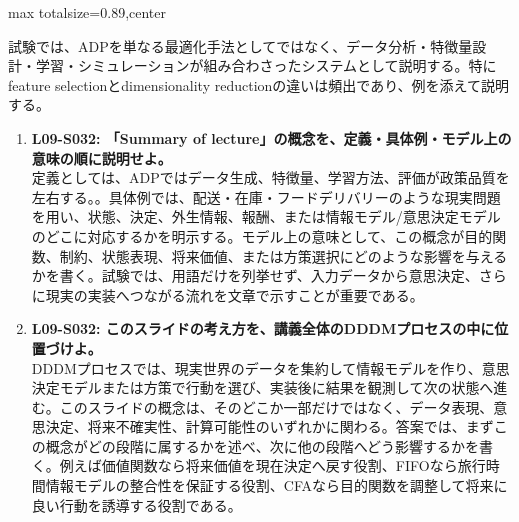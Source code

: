 \begin{minipage}[t]{0.58\textwidth}
\begin{adjustbox}{max totalsize={\textwidth}{0.89\textheight},center}
\begin{minipage}{\textwidth}
試験では、ADPを単なる最適化手法としてではなく、データ分析・特徴量設計・学習・シミュレーションが組み合わさったシステムとして説明する。特にfeature selectionとdimensionality reductionの違いは頻出であり、例を添えて説明する。\par{}\begin{enumerate}\item \textbf{L09-S032: 「Summary of lecture」の概念を、定義・具体例・モデル上の意味の順に説明せよ。}\\定義としては、ADPではデータ生成、特徴量、学習方法、評価が政策品質を左右する。。具体例では、配送・在庫・フードデリバリーのような現実問題を用い、状態、決定、外生情報、報酬、または情報モデル/意思決定モデルのどこに対応するかを明示する。モデル上の意味として、この概念が目的関数、制約、状態表現、将来価値、または方策選択にどのような影響を与えるかを書く。試験では、用語だけを列挙せず、入力データから意思決定、さらに現実の実装へつながる流れを文章で示すことが重要である。\item \textbf{L09-S032: このスライドの考え方を、講義全体のDDDMプロセスの中に位置づけよ。}\\DDDMプロセスでは、現実世界のデータを集約して情報モデルを作り、意思決定モデルまたは方策で行動を選び、実装後に結果を観測して次の状態へ進む。このスライドの概念は、そのどこか一部だけではなく、データ表現、意思決定、将来不確実性、計算可能性のいずれかに関わる。答案では、まずこの概念がどの段階に属するかを述べ、次に他の段階へどう影響するかを書く。例えば価値関数なら将来価値を現在決定へ戻す役割、FIFOなら旅行時間情報モデルの整合性を保証する役割、CFAなら目的関数を調整して将来に良い行動を誘導する役割である。\end{enumerate}
\end{minipage}
\end{adjustbox}
\end{minipage}

